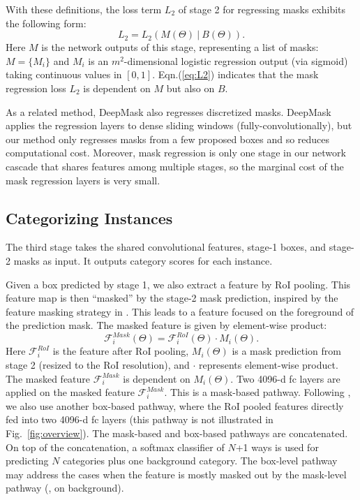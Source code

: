 \documentclass[10pt,twocolumn,letterpaper]{article}
\begin{document}
With these definitions, the loss term $L_2$ of stage 2 for regressing masks exhibits the following form:
\begin{equation}\label{eq:L2}
L_2 = L_2(M(\Theta) ~|~B(\Theta)).
\end{equation}
Here $M$ is the network outputs of this stage, representing a list of masks: $M=\{M_i\}$ and $M_i$ is an $m^2$-dimensional logistic regression output (via sigmoid) taking continuous values in $[0, 1]$. Eqn.(\ref{eq:L2}) indicates that the mask regression loss $L_2$ is dependent on $M$ but also on $B$.

As a related method, DeepMask \cite{Pinheiro2015} also regresses discretized masks. DeepMask applies the regression layers to dense sliding windows (fully-convolutionally), but our method only regresses masks from a few proposed boxes and so reduces computational cost.
Moreover, mask regression is only one stage in our network cascade that shares features among multiple stages, so the marginal cost of the mask regression layers is very small.

\subsection{Categorizing Instances}

The third stage takes the shared convolutional features, stage-1 boxes, and stage-2 masks as input. It outputs category scores for each instance.

Given a box predicted by stage 1, we also extract a feature by RoI pooling. This feature map is then ``masked'' by the stage-2 mask prediction, inspired by the feature masking strategy in \cite{Dai2015}. This leads to a feature focused on the foreground of the prediction mask.
The masked feature is given by element-wise product:
\begin{equation}\label{eq:masking}
\mathcal{F}^{Mask}_i(\Theta)=\mathcal{F}^{RoI}_i(\Theta)\cdot M_i(\Theta).
\end{equation}
Here $\mathcal{F}^{RoI}_i$ is the feature after RoI pooling, $M_i(\Theta)$ is a mask prediction from stage 2 (resized to the RoI resolution), and $\cdot$ represents element-wise product. The masked feature $\mathcal{F}^{Mask}_i$ is dependent on $M_i(\Theta)$.
Two 4096-d fc layers are applied on the masked feature $\mathcal{F}^{Mask}_i$. This is a mask-based pathway. Following \cite{Hariharan2014}, we also use another box-based pathway, where the RoI pooled features directly fed into two 4096-d fc layers (this pathway is not illustrated in Fig.~\ref{fig:overview}). The mask-based and box-based pathways are concatenated. On top of the concatenation, a softmax classifier of $N$+1 ways is used for predicting $N$ categories plus one background category. The box-level pathway may address the cases when the feature is mostly masked out by the mask-level pathway (\eg, on background).
\end{document}
